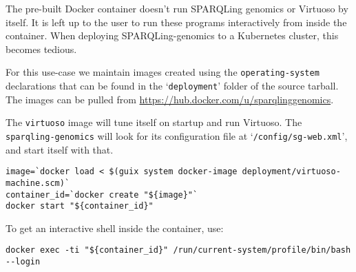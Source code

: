   The pre-built Docker container doesn't run SPARQLing genomics or Virtuoso
  by itself.  It is left up to the user to run these programs interactively
  from inside the container.  When deploying SPARQLing-genomics to a Kubernetes
  cluster, this becomes tedious.

  \begin{sloppypar}
  For this use-case we maintain images created using the \texttt{operating-system}
  declarations that can be found in the `\texttt{deployment}' folder of the
  source tarball.  The images can be pulled from
  \href{https://hub.docker.com/u/sparqlinggenomics}
       {https://hub.docker.com/u/sparqlinggenomics}.
  \end{sloppypar}

  The \texttt{virtuoso} image will tune itself on startup and
  run Virtuoso.  The \texttt{sparqling-genomics} will look for its
  configuration file at `\texttt{/config/sg-web.xml}', and start itself with
  that.

\begin{siderules}
\begin{verbatim}
image=`docker load < $(guix system docker-image deployment/virtuoso-machine.scm)`
container_id=`docker create "${image}"`
docker start "${container_id}"
\end{verbatim}
\end{siderules}

To get an interactive shell inside the container, use:
\begin{siderules}
\begin{verbatim}
docker exec -ti "${container_id}" /run/current-system/profile/bin/bash --login
\end{verbatim}
\end{siderules}

